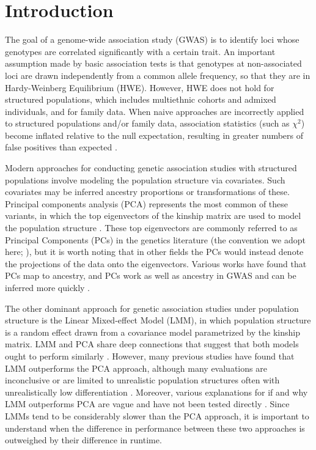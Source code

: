 \documentclass[11pt]{article}
\begin{document}
\clearpage

\tableofcontents

\clearpage
	
\section{Introduction} 

The goal of a genome-wide association study (GWAS) is to identify loci whose genotypes are correlated significantly with a certain trait.
An important assumption made by basic association tests is that genotypes at non-associated loci are drawn independently from a common allele frequency, so that they are in Hardy-Weinberg Equilibrium (HWE).
However, HWE does not hold for structured populations, which includes multiethnic cohorts and admixed individuals, and for family data.
When naive approaches are incorrectly applied to structured populations and/or family data, association statistics (such as $\chi^2$) become inflated relative to the null expectation, resulting in greater numbers of false positives than expected \citep{devlin_genomic_1999, voight_confounding_2005, astle_population_2009}.

Modern approaches for conducting genetic association studies with structured populations involve modeling the population structure via covariates.
Such covariates may be inferred ancestry proportions \citep{pritchard_association_2000} or transformations of these.
Principal components analysis (PCA) represents the most common of these variants, in which the top eigenvectors of the kinship matrix are used to model the population structure \citep{price_principal_2006}.
These top eigenvectors are commonly referred to as Principal Components (PCs) in the genetics literature (the convention we adopt here; \cite{patterson_population_2006}), but it is worth noting that in other fields the PCs would instead denote the projections of the data onto the eigenvectors.
Various works have found that PCs map to ancestry, and PCs work as well as ancestry in GWAS and can be inferred more quickly \citep{patterson_population_2006}.

The other dominant approach for genetic association studies under population structure is the Linear Mixed-effect Model (LMM), in which population structure is a random effect drawn from a covariance model parametrized by the kinship matrix.
LMM and PCA share deep connections that suggest that both models ought to perform similarly \citep{hoffman_correcting_2013}.
However, many previous studies have found that LMM outperforms the PCA approach, although many evaluations are inconclusive or are limited to unrealistic population structures often with unrealistically low differentiation \citep{astle_population_2009, kang_variance_2010, price_new_2010, wang_analytical_2013}.
Moreover, various explanations for if and why LMM outperforms PCA are vague and have not been tested directly \citep{price_new_2010, sul_mixed_2013, price_response_2013}.
Since LMMs tend to be considerably slower than the PCA approach, it is important to understand when the difference in performance between these two approaches is outweighed by their difference in runtime.
\end{document}
